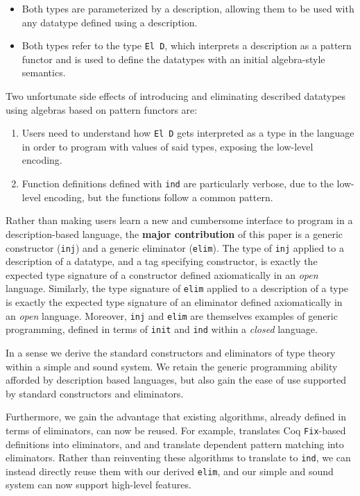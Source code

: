 \documentclass[preprint,nonatbib]{sigplanconf}
\begin{document}
\begin{itemize}
\item{}
Both types are parameterized by a description, allowing them to be used with any
datatype defined using a description.
\item{}
Both types refer to the type {\tt El D}, which interprets a
description as a pattern functor and is used to define the datatypes with an
initial algebra-style semantics.
\end{itemize}

Two unfortunate side effects of introducing and eliminating described
datatypes using algebras based on pattern functors are:

\begin{enumerate}
\item{}
Users need to understand how {\tt El D} gets interpreted as a type in
the language in order to program with values of said types, exposing
the low-level encoding.
\item{}
Function definitions defined with {\tt ind} are particularly verbose,
due to the low-level encoding, but the functions follow a common pattern.
\end{enumerate}

Rather than making users learn a new and cumbersome interface to
program in a description-based language, the {\bf major contribution} of
this paper is a generic constructor ({\tt inj}) and a generic
eliminator ({\tt elim}). The type of {\tt inj} applied to a
description of a datatype, and a tag specifying constructor, is exactly the
expected type signature of a constructor defined axiomatically in an
{\it open} language. Similarly, the type signature of {\tt elim} applied to
a description of a type is exactly the expected type signature
of an eliminator defined axiomatically in an {\it open} language.
Moreover, {\tt inj} and {\tt elim} are themselves examples of generic
programming, defined in terms of {\tt init} and {\tt ind} within a
{\it closed} language.

In a sense we derive the standard constructors and
eliminators of type theory within a simple and sound system.
We retain the generic programming ability afforded by description based languages,
but also gain the ease of use supported by standard constructors and
eliminators.

Furthermore, we gain the advantage that existing algorithms, already defined in
terms of eliminators, can now be reused.
For example, \citet{gimenez1995codifying} translates
{\sc Coq} {\tt Fix}-based definitions into eliminators,
and \citet{Goguen06eliminatingdependent} and
\citet{McBride:2000:EM:646540.759262}
translate dependent pattern matching into
eliminators. Rather than reinventing these algorithms to translate to
{\tt ind}, we can instead directly reuse them with our derived {\tt elim},
and our simple and sound system can now support high-level features.
\end{document}
